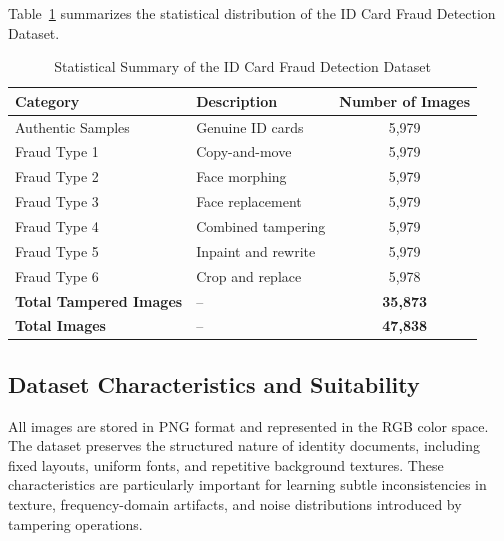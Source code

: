\documentclass[12pt]{article}
\begin{document}
Table~\ref{tab:dataset_statistics} summarizes the statistical distribution of the ID Card Fraud Detection Dataset.

\begin{table}[h]
    \centering
    \caption{Statistical Summary of the ID Card Fraud Detection Dataset}
    \label{tab:dataset_statistics}
    \begin{tabular}{|l|l|c|}
        \hline
        \textbf{Category}              & \textbf{Description} & \textbf{Number of Images} \\
        \hline
        Authentic Samples              & Genuine ID cards     & 5,979                     \\
        Fraud Type 1                   & Copy-and-move        & 5,979                     \\
        Fraud Type 2                   & Face morphing        & 5,979                     \\
        Fraud Type 3                   & Face replacement     & 5,979                     \\
        Fraud Type 4                   & Combined tampering   & 5,979                     \\
        Fraud Type 5                   & Inpaint and rewrite  & 5,979                     \\
        Fraud Type 6                   & Crop and replace     & 5,978                     \\
        \hline
        \textbf{Total Tampered Images} & --                   & \textbf{35,873}           \\
        \textbf{Total Images}          & --                   & \textbf{47,838}           \\
        \hline
    \end{tabular}
\end{table}

\subsection{Dataset Characteristics and Suitability}

All images are stored in PNG format and represented in the RGB color space. The dataset preserves the structured nature of identity documents, including fixed layouts, uniform fonts, and repetitive background textures. These characteristics are particularly important for learning subtle inconsistencies in texture, frequency-domain artifacts, and noise distributions introduced by tampering operations.
\end{document}
